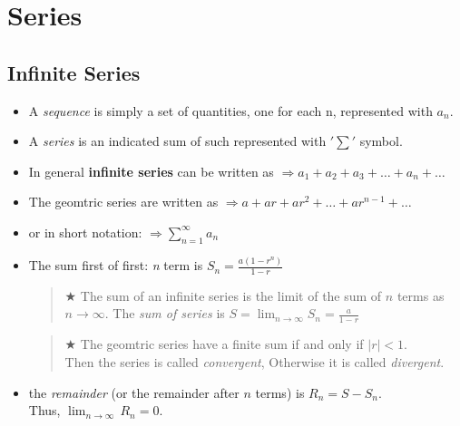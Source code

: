 \chapter{Series} \label{ch:series}
        \section{Infinite Series}

            \begin{itemize}
                \item A \textit{sequence} is simply a set of quantities, one for each n, represented with $a_n$. 
                \item A \textit{series} is an indicated sum of such represented with $'\sum'$ symbol.
                \item In general \textbf{infinite series} can be written as $ \Rightarrow  a_1 + a_2 + a_3 + \dots + a_n + \dots $
                \item The geomtric series are written as $ \Rightarrow a+ar+ar^2+\dots+ar^{n-1} + \dots$
                \item or in short notation: $ \Rightarrow \sum_{n=1}^{\infty} a_n $
                \item The sum first of first: \textit{n} term is \colorbox{c1}{$ S_n=\frac{a(1-r^n)}{1-r} $}
                \begin{quote}
                    $\bigstar$ The sum of an infinite series is the limit of the sum of $n$ terms as $n\to\infty$.
                    The \textit{sum of series} is \colorbox{c1}{$ S = \lim_{n \to \infty} S_n=\frac{a}{1-r}$}
                \end{quote}
                
                \begin{quote}
                    $\bigstar$ The geomtric series have a finite sum if and only if $|r|<1$.\\
                    Then the series is called \textit{convergent}, Otherwise it is called \textit{divergent}.
                \end{quote}
                \item the \textit{remainder} (or the remainder after $n$ terms) is \colorbox{c1}{$R_n=S-S_n$}.\\
                Thus, \colorbox{c1}{$\lim_{n\to\infty}\, R_n = 0$.}
                
            \end{itemize}


